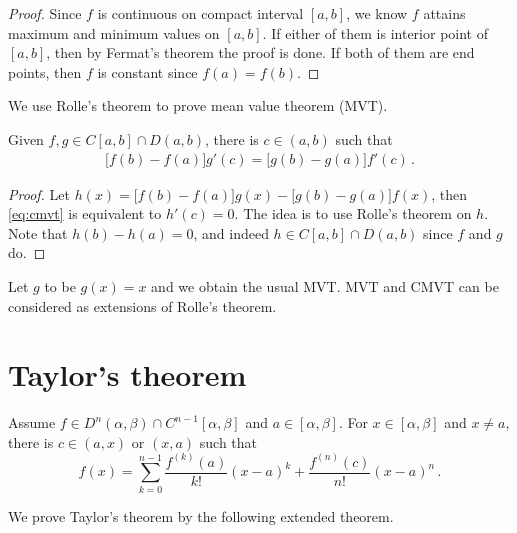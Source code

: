 \documentclass{article}
\begin{document}
\begin{proof}
    Since $ f $ is continuous on compact interval $ [a, b] $, we know $ f $ attains maximum and minimum values on $ [a, b] $. If either of them is interior point of $ [a, b] $, then by Fermat's theorem the proof is done. If both of them are end points, then $ f $ is constant since $ f(a) = f(b) $.
\end{proof}

We use Rolle's theorem to prove mean value theorem (MVT).
\begin{theorem}
    Given $ f, g \in C[a, b] \cap D(a, b) $, there is $ c \in (a, b) $ such that
    \begin{align} \label{eq:cmvt}
        \big[ f(b) - f(a) \big] g'(c) = \big[ g(b) - g(a) \big] f'(c)  \,.
    \end{align}
\end{theorem}
\begin{proof}
    Let $ h(x) = \big[ f(b) - f(a) \big] g(x) - \big[ g(b) - g(a) \big] f(x) $, then \eqref{eq:cmvt} is equivalent to $ h'(c) = 0 $. The idea is to use Rolle's theorem on $ h $. Note that $ h(b) - h(a) = 0 $, and indeed $ h \in C[a, b] \cap D(a, b) $ since $ f $ and $ g $ do.
\end{proof}

Let $ g $ to be $ g(x) = x $ and we obtain the usual MVT. MVT and CMVT can be considered as extensions of Rolle's theorem.

\section{Taylor's theorem}
\begin{theorem} \label{thm:taylor}
    Assume $ f \in D^{n} (\alpha, \beta) \cap C^{n - 1} [\alpha, \beta] $ and $ a \in [\alpha, \beta] $. For $ x \in [\alpha, \beta] $ and $ x \neq a $, there is $ c \in (a, x) \text { or } (x, a) $ such that
    \[
        f(x) = \sum_{k = 0}^{n-1} \dfrac{f^{(k)} (a)}{k!} (x - a)^k + \dfrac{f^{(n)}(c)}{n!} (x - a)^n \,.
    \]
\end{theorem}

We prove Taylor's theorem by the following extended theorem.
\end{document}
